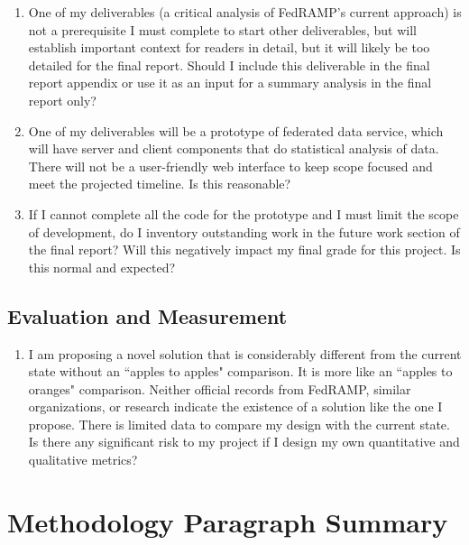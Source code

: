 \documentclass{jdf}
\begin{document}
\begin{enumerate}
    \item One of my deliverables (a critical analysis of FedRAMP's current approach) is not a prerequisite I must complete to start other deliverables, but will establish important context for readers in detail, but it will likely be too detailed for the final report. Should I include this deliverable in the final report appendix or use it as an input for a summary analysis in the final report only?
    \item One of my deliverables will be a prototype of federated data service, which will have server and client components that do statistical analysis of data. There will not be a user-friendly web interface to keep scope focused and meet the projected timeline. Is this reasonable?
    \item If I cannot complete all the code for the prototype and I must limit the scope of development, do I inventory outstanding work in the future work section of the final report? Will this negatively impact my final grade for this project. Is this normal and expected?
\end{enumerate}

\subsection*{Evaluation and Measurement}

\begin{enumerate}
    \item I am proposing a novel solution that is considerably different from the current state without an ``apples to apples" comparison. It is more like an ``apples to oranges" comparison. Neither official records from FedRAMP, similar organizations, or research indicate the existence of a solution like the one I propose. There is limited data to compare my design with the current state. Is there any significant risk to my project if I design my own quantitative and qualitative metrics?    
\end{enumerate}

\section*{Methodology Paragraph Summary}
\end{document}
